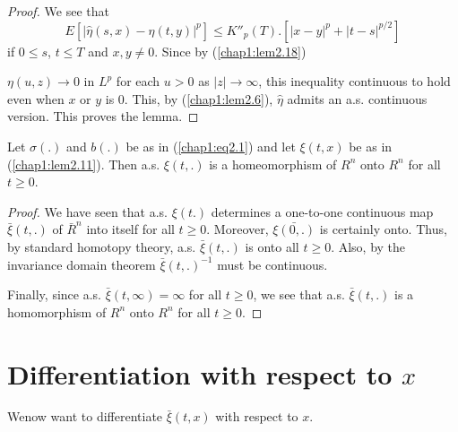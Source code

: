 \begin{proof}
We see that 
$$
E [ |\hat {\eta}(s,x)-\hat{\eta}(t,y)|^p] \le K''_p (T). [|x-y|^p 
  +|t-s|^{p/2}] 
$$
if $0 \le s$, $t \le T$ and $x,y \neq 0$. Since by (\ref{chap1:lem2.18}) 

$\eta (u,z) \to 0$ in $L^p$ for each $u >0$ as $|z|\to \infty$, this
inequality continuous to hold even when $x$ or $y$ is 0. This, by
(\ref{chap1:lem2.6}), $\hat{\eta}$ admits an a.s. continuous
version. This proves the lemma.
\end{proof}

\setcounter{theorem}{19}
\begin{theorem}%
Let $\sigma(.)$ and $b(.)$ be as in (\ref{chap1:eq2.1}) and let
$\xi(t,x)$ be as in (\ref{chap1:lem2.11}). Then a.s. $\xi (t,.)$ is a
homeomorphism of $R^n$ onto $R^n$ for all $t \ge 0$.  
\end{theorem}

\begin{proof}
We have seen that a.s. $\xi(t.)$ determines a one-to-one continuous
map $\bar{\xi}(t,.)$ of $\bar{R}^{n}$ into itself for all $t \ge
0$. Moreover, $\bar{\xi(0,.)}$ is certainly onto. Thus, by standard
homotopy theory, a.s. $\bar{\xi}(t,.)$ is onto all $t \ge 0$. Also,
by the invariance domain theorem $\bar{\xi}(t,.)^{-1}$ must be
continuous. 

Finally, since a.s. $\bar{\xi}(t,\infty)=\infty$ for all $t \ge 0$, we
see that a.s. $\bar{\xi}(t,.)$ is a homomorphism of $R^n$ onto $R^n$ for all
$t \ge 0$. 
\end{proof}



\section{Differentiation with respect to $x$} %

We\pageoriginale now want to differentiate $\bar{\xi}(t,x)$ with
respect to $x$.  

